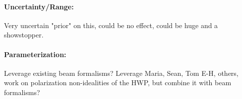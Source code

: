 \paragraph{Uncertainty/Range:}
Very uncertain "prior" on this, could be no effect, could be huge and a showstopper.

\paragraph{Parameterization:}

Leverage existing beam formalisms? Leverage Maria, Sean, Tom E-H, others, work on polarization non-idealities of the HWP, but combine it with beam formalisms?
